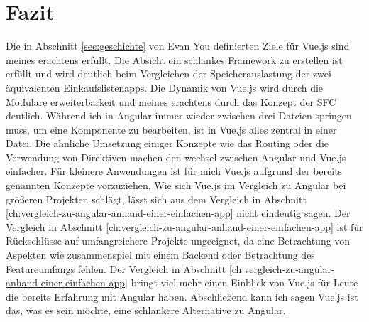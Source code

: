 

\chapter{Fazit}
Die in Abschnitt \ref{sec:geschichte} von Evan You definierten Ziele für Vue.js sind meines erachtens erfüllt.
Die Absicht ein schlankes Framework zu erstellen ist erfüllt und wird deutlich beim Vergleichen der Speicherauslastung
der zwei äquivalenten Einkaufslistenapps.
Die Dynamik von Vue.js wird durch die Modulare erweiterbarkeit und meines erachtens durch das
Konzept der SFC deutlich.
Während ich in Angular immer wieder zwischen drei Dateien springen muss, um eine Komponente zu bearbeiten,
ist in Vue.js alles zentral in einer Datei.
Die ähnliche Umsetzung einiger Konzepte wie das Routing oder die Verwendung von Direktiven machen
den wechsel zwischen Angular und Vue.js einfacher.
Für kleinere Anwendungen ist für mich Vue.js aufgrund der bereits genannten Konzepte vorzuziehen.
Wie sich Vue.js im Vergleich zu Angular bei größeren Projekten schlägt, lässt sich aus dem Vergleich
in Abschnitt \ref{ch:vergleich-zu-angular-anhand-einer-einfachen-app} nicht eindeutig sagen.
Der Vergleich in Abschnitt \ref{ch:vergleich-zu-angular-anhand-einer-einfachen-app} ist für Rückschlüsse
auf umfangreichere Projekte ungeeignet, da eine Betrachtung von Aspekten wie zusammenspiel mit einem Backend
oder Betrachtung des Featureumfangs fehlen.
Der Vergleich in Abschnitt \ref{ch:vergleich-zu-angular-anhand-einer-einfachen-app} bringt viel mehr einen
Einblick von Vue.js für Leute die bereits Erfahrung mit Angular haben.
Abschließend kann ich sagen Vue.js ist das, was es sein möchte, eine schlankere Alternative zu Angular.
